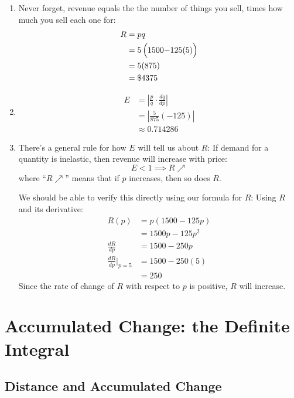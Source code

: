 \documentclass[oneside]{book}
\newcommand{\deriv}[2]{\frac{d#1}{d#2}}
\newcommand{\eval}{\Big|}
\newcommand{\abs}[1]{\left\lvert {#1} \right\rvert}
\newcommand{\BigParens}[1]
{\left(\raisebox{0in}[1.25\height]{$#1$}\right)}
\theoremstyle{definition}
\theoremstyle{solution}
\newtheorem*{solution}{Solution}
\newenvironment{solution}{\vspace{2in}\comment}{\endcomment}
\begin{document}
\begin{solution}
  \begin{enumerate}
  \item Never forget, revenue equals the the number of things you
    sell, times how much you sell each one for:
    \begin{align*}
      R & = pq\\
        & =5\BigParens{1500{-}125(5)}\\
        & = 5(875) \\
        & = \$4375
    \end{align*}

  \item 
    \begin{align*}
      E & = \abs{ \frac{p}{q}\cdot \deriv{q}{p} }\\
        & = \abs{ \frac{5}{875} (-125) }\\
        & \approx 0.714286
    \end{align*}

  \item There's a general rule for how $E$ will tell us about $R$: If
    demand for a quantity is inelastic, then revenue will increase
    with price:
    $$
    E < 1 \implies R \nearrow
    $$
    where ``$R\nearrow$'' means that if $p$ increases, then so does
    $R$.

    We should be able to verify this directly using our formula for
    $R$: Using $R$ and its derivative:
    \begin{align*}
      R(p)               & = p(1500-125p) \\
                         & = 1500p-125p^2 \\
      \deriv{R}{p}            & = 1500-250p    \\
      \deriv{R}{p}\eval_{p=5} & = 1500-250(5)  \\
                         & = 250
    \end{align*}
    Since the rate of change of $R$ with respect to $p$ is positive,
    $R$ will increase.
  \end{enumerate}
\end{solution}


\chapter{Accumulated Change: the Definite Integral}
\section{Distance and Accumulated Change}
\end{document}
